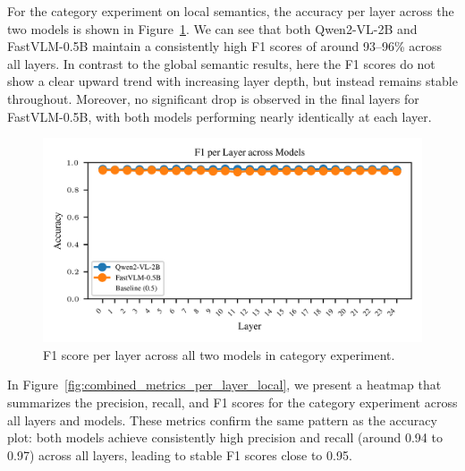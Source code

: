 \documentclass[11pt]{article}
\begin{document}
For the category experiment on local semantics, the accuracy per layer across the two models is shown in Figure~\ref{fig:f1_per_layer_local}.
We can see that both Qwen2-VL-2B and FastVLM-0.5B maintain a consistently high F1 scores of around 93--96\% across all layers.
In contrast to the global semantic results, here the F1 scores do not show a clear upward trend with increasing layer depth, but instead remains stable throughout.
Moreover, no significant drop is observed in the final layers for FastVLM-0.5B, with both models performing nearly identically at each layer.

\begin{figure}[H]
    \centering
    \includegraphics[width=1\linewidth]{figures/local/_combined_exp2/f1_lines_per_layer.png}
    \caption{F1 score per layer across all two models in category experiment.}
    \label{fig:f1_per_layer_local}
\end{figure}

In Figure~\ref{fig:combined_metrics_per_layer_local}, we present a heatmap that summarizes the precision, recall, and F1 scores for the category experiment across all layers and models.
These metrics confirm the same pattern as the accuracy plot: both models achieve consistently high precision and recall (around 0.94 to 0.97) across all layers, leading to stable F1 scores close to 0.95.
\end{document}
